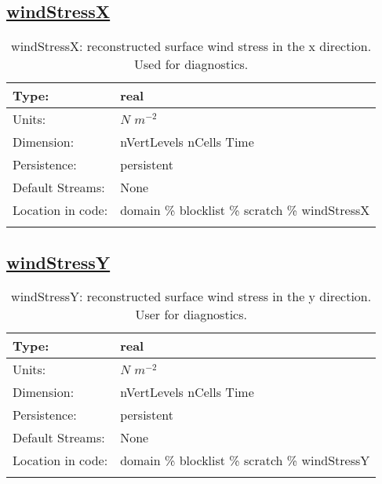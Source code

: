 \subsection[windStressX]{\hyperref[sec:var_tab_scratch]{windStressX}}
\label{subsec:var_sec_scratch_windStressX}
\begin{center}
\begin{longtable}{| p{2.0in} | p{4.0in} |}
        \hline 
        Type: & real \\
        \hline 
        Units: & $N$ $m^{-2}$ \\
        \hline 
        Dimension: & nVertLevels nCells Time \\
        \hline 
        Persistence: & persistent \\
        \hline 
		 Default Streams: & None \\
        \hline 
		 Location in code: & domain \% blocklist \% scratch \% windStressX \\
		 \hline 
    \caption{windStressX: reconstructed surface wind stress in the x direction. Used for diagnostics.}
\end{longtable}
\end{center}
\subsection[windStressY]{\hyperref[sec:var_tab_scratch]{windStressY}}
\label{subsec:var_sec_scratch_windStressY}
\begin{center}
\begin{longtable}{| p{2.0in} | p{4.0in} |}
        \hline 
        Type: & real \\
        \hline 
        Units: & $N$ $m^{-2}$ \\
        \hline 
        Dimension: & nVertLevels nCells Time \\
        \hline 
        Persistence: & persistent \\
        \hline 
		 Default Streams: & None \\
        \hline 
		 Location in code: & domain \% blocklist \% scratch \% windStressY \\
		 \hline 
    \caption{windStressY: reconstructed surface wind stress in the y direction. User for diagnostics.}
\end{longtable}
\end{center}
